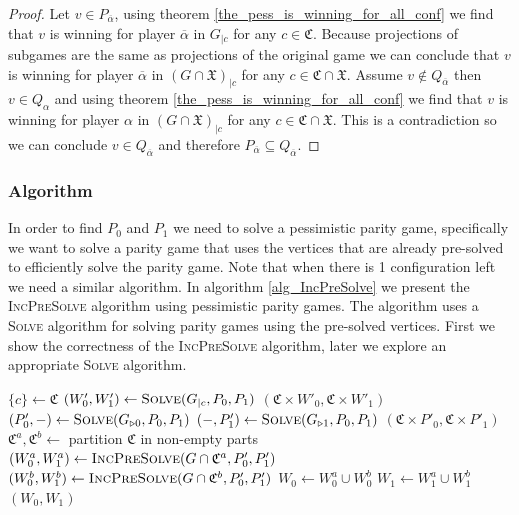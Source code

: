 \begin{lemma}
\begin{proof}
		
		Let $v \in P_{\overline{\alpha}}$, using theorem \ref{the_pess_is_winning_for_all_conf} we find that $v$ is winning for player $\overline{\alpha}$ in $G_{|c}$ for any $c \in \mathfrak{C}$. Because projections of subgames are the same as projections of the original game we can conclude that $v$ is winning for player $\overline{\alpha}$ in $(G \cap \mathfrak{X})_{|c}$ for any $c \in \mathfrak{C} \cap \mathfrak{X}$.	Assume $v \notin Q_{\overline{\alpha}}$ then $v \in Q_{\alpha}$ and using theorem \ref{the_pess_is_winning_for_all_conf} we find that $v$ is winning for player $\alpha$ in $(G \cap \mathfrak{X})_{|c}$ for any $c \in \mathfrak{C} \cap \mathfrak{X}$. This is a contradiction so we can conclude $v \in Q_{\overline{\alpha}}$ and therefore $P_{\overline{\alpha}} \subseteq Q_{\overline{\alpha}}$.
	\end{proof}
\end{lemma}
\subsubsection{Algorithm}
In order to find $P_0$ and $P_1$ we need to solve a pessimistic parity game, specifically we want to solve a parity game that uses the vertices that are already pre-solved to efficiently solve the parity game. Note that when there is 1 configuration left we need a similar algorithm. In algorithm \ref{alg_IncPreSolve} we present the \textsc{IncPreSolve} algorithm using pessimistic parity games. The algorithm uses a \textsc{Solve} algorithm for solving parity games using the pre-solved vertices. First we show the correctness of the \textsc{IncPreSolve} algorithm, later we explore an appropriate \textsc{Solve} algorithm.
\begin{algorithm}
	\caption{$\textsc{IncPreSolve}(G = (V,V_0,V_1, E, \Omega, \mathfrak{C}, \theta), P_0,P_1)$}\label{alg_IncPreSolve}
	\begin{algorithmic}[1]
		\State $\{c\} \gets \mathfrak{C}$
		\State $(W'_0,W'_1) \gets \textsc{Solve}(G_{|c}, P_0,P_1)$
		\State \Return $(\mathfrak{C} \times W'_0, \mathfrak{C} \times W'_1)$
		\EndIf
		\State $(P'_0,-) \gets \textsc{Solve}(G_{\triangleright0}, P_0, P_1)$
		\State $(-,P'_1) \gets \textsc{Solve}(G_{\triangleright1}, P_0, P_1)$
		\State \Return $(\mathfrak{C} \times P'_0, \mathfrak{C} \times P'_1)$
		\EndIf
		\State $\mathfrak{C}^a, \mathfrak{C}^b \gets $ partition $\mathfrak{C}$ in non-empty parts
		\State $(W_0^a, W_1^a) \gets \textsc{IncPreSolve}(G \cap \mathfrak{C}^a, P'_0,P'_1)$
		\State $(W_0^b, W_1^b) \gets \textsc{IncPreSolve}(G \cap \mathfrak{C}^b, P'_0,P'_1)$
		\State $W_0 \gets W_0^a \cup W_0^b$
		\State $W_1 \gets W_1^a \cup W_1^b$
		\State \Return $(W_0,W_1)$
	\end{algorithmic}
\end{algorithm}

